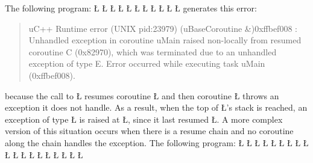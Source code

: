 \documentclass[openright,twoside]{report}
\begin{document}
The following program:
\LGinlinefalse\LGbegin\lgrinde
\L{}
\L{\LB{}}
\L{}
\L{\LB{}}
\L{}
\L{\LB{}}
\L{\LB{\};}}
\L{}
\L{\LB{}}
\L{\LB{}}
\CE{}\L{\LB{\}}}
\endlgrinde\LGend
generates this error:
\begin{quote}
\BGfont
uC++ Runtime error (UNIX pid:23979) (uBaseCoroutine \&)0xffbef008 : Unhandled exception in coroutine uMain raised non-locally from resumed coroutine C (0x82970), which was terminated due to an unhandled exception of type E.
Error occurred while executing task uMain (0xffbef008).
\end{quote}
because the call to \LGinlinetrue\LGbegin\lgrinde\L{}\endlgrinde\LGend{} resumes coroutine \LGinlinetrue\LGbegin\lgrinde\L{}\endlgrinde\LGend{} and then coroutine \LGinlinetrue\LGbegin\lgrinde\L{}\endlgrinde\LGend{} throws an exception it does not handle.
As a result, when the top of \LGinlinetrue\LGbegin\lgrinde\L{}\endlgrinde\LGend{}'s stack is reached, an exception of type \LGinlinetrue\LGbegin\lgrinde\L{}\endlgrinde\LGend{} is raised at \LGinlinetrue\LGbegin\lgrinde\L{}\endlgrinde\LGend{}, since it last resumed \LGinlinetrue\LGbegin\lgrinde\L{}\endlgrinde\LGend{}.
A more complex version of this situation occurs when there is a resume chain and no coroutine along the chain handles the exception.
The following program:
\LGinlinefalse\LGbegin\lgrinde
\L{}
\L{\LB{}}
\L{}
\L{\LB{}}
\L{}
\L{\LB{}}
\L{\LB{\};}}
\L{}
\L{\LB{}}
\L{\LB{}}
\L{\LB{}}
\L{\LB{}}
\L{}
\L{\LB{}}
\L{\LB{\};}}
\L{}
\L{\LB{}}
\L{\LB{}}
\CE{}\L{\LB{\}}}
\endlgrinde\LGend
\end{document}
